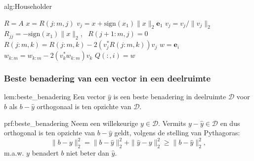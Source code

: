 \begin{alg}{alg:Householder}
    \vspace{-0.3cm}
    \begin{tcolorbox}[colback=white, colframe=gray, arc=0mm] 
        \begin{algorithmic}[1]
            \State $R = A$
                \State $x= R(j:m,j)$
                \State $v_j = x + \text{sign}(x_1)\|x\|_2 \boldsymbol{e}_1$
                \State $v_j = v_j / \|v_j\|_2$
                \State $R_{jj} = -\text{sign}(x_1)\|x\|_2$, \ $R(j+1:m,j) = 0$
                    \State $R(j:m,k) = R(j:m,k) - 2(v_j^*R(j:m,k))v_j$
                \EndFor
            \EndFor 
                \State $w = \boldsymbol{e}_i$
                    \State $w_{k:m} = w_{k:m} - 2(v_k^*w_{k:m})v_k$
                \EndFor
                \State $Q(:,i) = w$
            \EndFor
        \end{algorithmic}
    \end{tcolorbox}
    \vspace{-0.3cm}
\end{alg}

\newpage

\subsubsection{Beste benadering van een vector in een deelruimte}

\vspace{0.5cm}

\begin{lem}{lem:beste_benadering}
    \vspace{-0.1cm}
    Een vector $\hat{y}$ is een beste benadering in deelruimte $\mathcal{D}$ voor $b$ als $b - \hat{y}$ orthogonaal is ten opzichte van $\mathcal{D}$.
    \vspace{-0.1cm}
\end{lem}

\begin{prf}{prf:beste_benadering}
    \vspace{-0.1cm}
    Neem een willekeurige $y \in \mathcal{D}$. Vermits $y-\hat{y} \in \mathcal{D}$ en dus orthogonal is ten opzichte van $b - \hat{y}$ geldt, volgens de stelling van Pythagoras:
    \begin{equation*}
        \|b - y\|_2^2 = \| b - \hat{y}\|_2^2 + \| \hat{y} - y\|_2^2 \geq \| b - \hat{y}\|_2^2,
    \end{equation*}
    m\@.a\@.w\@. $y$ benadert $b$ niet beter dan $\hat{y}$.
    \vspace{-0.3cm}
\end{prf}

